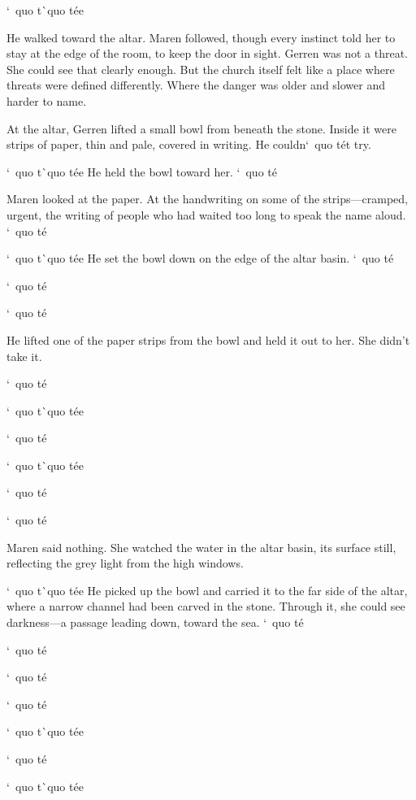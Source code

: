 \documentclass[12pt,letterpaper,openany]{book}
\begin{document}
\par
`\ quo t\`\ quo t\'e{}e{}
\par
He walked toward the altar. Maren followed, though every instinct told her to stay at the edge of the room, to keep the door in sight. Gerren was not a threat. She could see that clearly enough. But the church itself felt like a place where threats were defined differently. Where the danger was older and slower and harder to name.
\par
At the altar, Gerren lifted a small bowl from beneath the stone. Inside it were strips of paper, thin and pale, covered in writing. He couldn`\ quo t\'e{}t try.
\par
`\ quo t\`\ quo t\'e{}e{} He held the bowl toward her. `\ quo t\'e{}
\par
Maren looked at the paper. At the handwriting on some of the strips—cramped, urgent, the writing of people who had waited too long to speak the name aloud. `\ quo t\'e{}
\par
`\ quo t\`\ quo t\'e{}e{} He set the bowl down on the edge of the altar basin. `\ quo t\'e{}
\par
`\ quo t\'e{}
\par
`\ quo t\'e{}
\par
He lifted one of the paper strips from the bowl and held it out to her. She didn't take it.
\par
`\ quo t\'e{}
\par
`\ quo t\`\ quo t\'e{}e{}
\par
`\ quo t\'e{}
\par
`\ quo t\`\ quo t\'e{}e{}
\par
`\ quo t\'e{}
\par
`\ quo t\'e{}
\par
Maren said nothing. She watched the water in the altar basin, its surface still, reflecting the grey light from the high windows.
\par
`\ quo t\`\ quo t\'e{}e{} He picked up the bowl and carried it to the far side of the altar, where a narrow channel had been carved in the stone. Through it, she could see darkness—a passage leading down, toward the sea. `\ quo t\'e{}
\par
`\ quo t\'e{}
\par
`\ quo t\'e{}
\par
`\ quo t\'e{}
\par
`\ quo t\`\ quo t\'e{}e{}
\par
`\ quo t\'e{}
\par
`\ quo t\`\ quo t\'e{}e{}
\par
\end{document}
